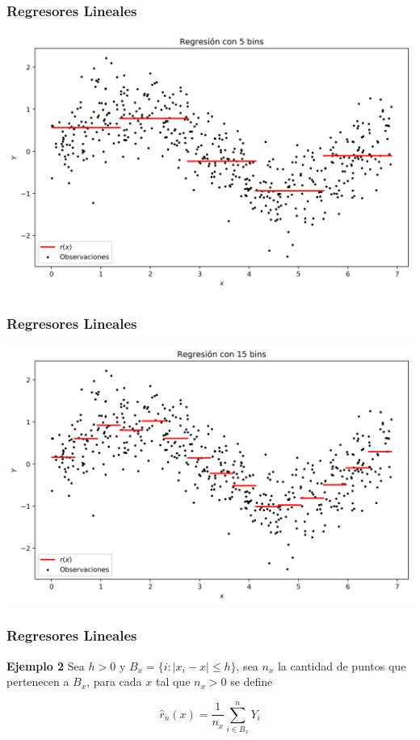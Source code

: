 \documentclass[aspectratio=169,spanish]{beamer}
\begin{document}
\begin{frame}
\frametitle{Regresores Lineales}
\center
\includegraphics[scale=0.5]{regresion3}

\end{frame}
\begin{frame}
\frametitle{Regresores Lineales}
\center
\includegraphics[scale=0.5]{regresion4}

\end{frame}


\begin{frame}
\frametitle{Regresores Lineales}

\textbf{Ejemplo 2}
Sea $h>0$ y $B_x=\{i:|x_i-x|\le h\}$, sea $n_x$ la cantidad de puntos que pertenecen a $B_x$, para cada $x$ tal que $n_x>0$ se define  


$$\hat{r}_n(x)=\frac{1}{n_x}\sum_{i\in B_x}^{n}Y_i$$
\end{frame}
\end{document}
